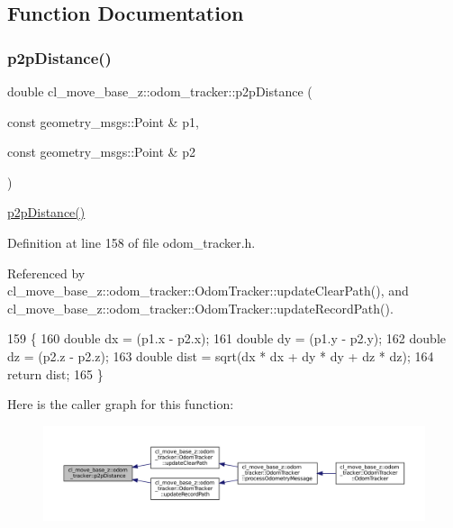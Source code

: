 \subsection{Function Documentation}
\mbox{\label{namespacecl__move__base__z_1_1odom__tracker_a501582a760a02ce0069d95bfc67ca973}} 
\subsubsection{\texorpdfstring{p2p\+Distance()}{p2pDistance()}}
{\footnotesize\ttfamily double cl\+\_\+move\+\_\+base\+\_\+z\+::odom\+\_\+tracker\+::p2p\+Distance (\begin{DoxyParamCaption}\item[{const geometry\+\_\+msgs\+::\+Point \&}]{p1,  }\item[{const geometry\+\_\+msgs\+::\+Point \&}]{p2 }\end{DoxyParamCaption})\hspace{0.3cm}{\ttfamily [inline]}}

\hyperlink{namespacecl__move__base__z_1_1odom__tracker_a501582a760a02ce0069d95bfc67ca973}{p2p\+Distance()} 

Definition at line 158 of file odom\+\_\+tracker.\+h.



Referenced by cl\+\_\+move\+\_\+base\+\_\+z\+::odom\+\_\+tracker\+::\+Odom\+Tracker\+::update\+Clear\+Path(), and cl\+\_\+move\+\_\+base\+\_\+z\+::odom\+\_\+tracker\+::\+Odom\+Tracker\+::update\+Record\+Path().


\begin{DoxyCode}
159 \{
160     \textcolor{keywordtype}{double} dx = (p1.x - p2.x);
161     \textcolor{keywordtype}{double} dy = (p1.y - p2.y);
162     \textcolor{keywordtype}{double} dz = (p2.z - p2.z);
163     \textcolor{keywordtype}{double} dist = sqrt(dx * dx + dy * dy + dz * dz);
164     \textcolor{keywordflow}{return} dist;
165 \}
\end{DoxyCode}
Here is the caller graph for this function\+:
\nopagebreak
\begin{figure}[H]
\begin{center}
\leavevmode
\includegraphics[width=350pt]{namespacecl__move__base__z_1_1odom__tracker_a501582a760a02ce0069d95bfc67ca973_icgraph}
\end{center}
\end{figure}
